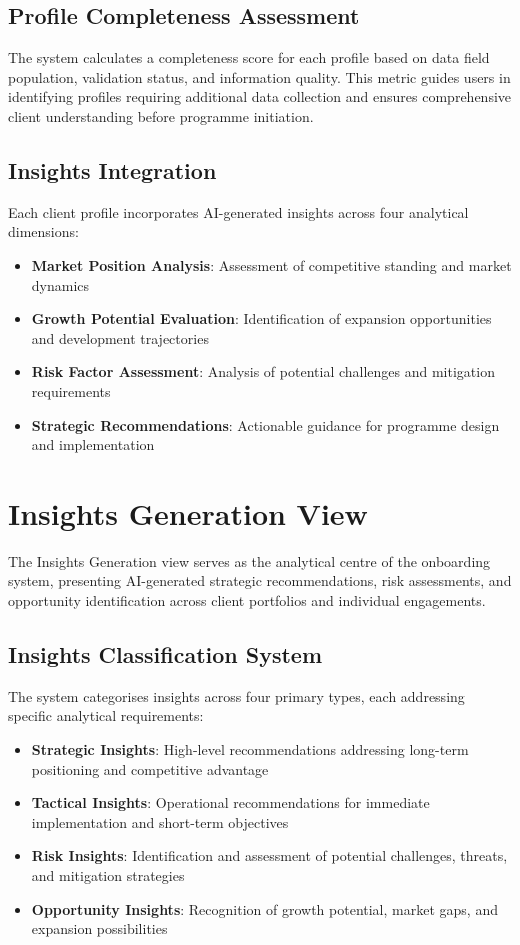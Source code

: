 \documentclass{article}
\begin{document}
\subsection{Profile Completeness Assessment}
The system calculates a completeness score for each profile based on data field population, validation status, and information quality. This metric guides users in identifying profiles requiring additional data collection and ensures comprehensive client understanding before programme initiation.

\subsection{Insights Integration}
Each client profile incorporates AI-generated insights across four analytical dimensions:

\begin{itemize}
    \item \textbf{Market Position Analysis}: Assessment of competitive standing and market dynamics
    \item \textbf{Growth Potential Evaluation}: Identification of expansion opportunities and development trajectories
    \item \textbf{Risk Factor Assessment}: Analysis of potential challenges and mitigation requirements
    \item \textbf{Strategic Recommendations}: Actionable guidance for programme design and implementation
\end{itemize}

\section{Insights Generation View}
The Insights Generation view serves as the analytical centre of the onboarding system, presenting AI-generated strategic recommendations, risk assessments, and opportunity identification across client portfolios and individual engagements.

\subsection{Insights Classification System}
The system categorises insights across four primary types, each addressing specific analytical requirements:

\begin{itemize}
    \item \textbf{Strategic Insights}: High-level recommendations addressing long-term positioning and competitive advantage
    \item \textbf{Tactical Insights}: Operational recommendations for immediate implementation and short-term objectives
    \item \textbf{Risk Insights}: Identification and assessment of potential challenges, threats, and mitigation strategies
    \item \textbf{Opportunity Insights}: Recognition of growth potential, market gaps, and expansion possibilities
\end{itemize}
\end{document}
